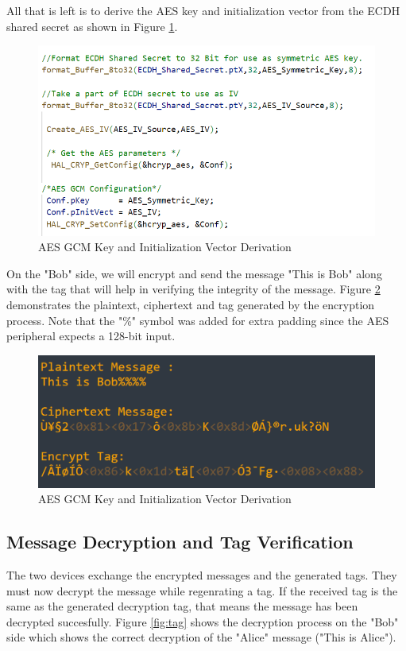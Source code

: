     All that is left is to derive the AES key and initialization vector from the ECDH shared secret as shown in Figure \ref{fig:deriv}.
    
    \begin{figure}[H]
    \centering
    \includegraphics[width=12cm]{img/deriv.png}
        \caption{AES GCM Key and Initialization Vector Derivation}
    \label{fig:deriv}
    \end{figure}

    On the "Bob" side, we will encrypt and send the message "This is Bob" along with the tag that will help in verifying the integrity of the message. Figure \ref{fig:bob hello} demonstrates the plaintext, ciphertext and tag generated by the encryption process. Note that the "\%" symbol was added for extra padding since the AES peripheral expects a 128-bit input.

    \begin{figure}[H]
    \centering
    \includegraphics[width=12cm]{img/bob hello.png}
        \caption{AES GCM Key and Initialization Vector Derivation}
    \label{fig:bob hello}
    \end{figure}

    \subsection{Message Decryption and Tag Verification}
    The two devices exchange the encrypted messages and the generated tags. They must now decrypt the message while regenrating a tag. If the received tag is the same as the generated decryption tag, that means the message has been decrypted succesfully. Figure \ref{fig:tag} shows the decryption process on the "Bob" side which shows the correct decryption of the "Alice" message ("This is Alice").
    
